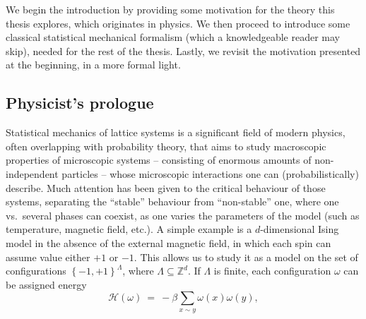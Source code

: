 \documentclass[12pt]{article}
\renewcommand{\H}{\mathcal{H}}
\newcommand{\Z}{\mathbb{Z}}
\newcommand{\set}[1]{\left\{#1\right\}}
\newcommand{\1}{\mathbbm{1}}
\newcommand{\5}{\vspace{0.5cm}}
\theoremstyle{definition}
\begin{document}
We begin the introduction by providing some motivation for the theory this thesis explores, which originates in physics. We then proceed to introduce some classical statistical mechanical formalism (which a knowledgeable reader may skip), needed for the rest of the thesis. Lastly, we revisit the motivation presented at the beginning, in a more formal light.


\subsection{Physicist's prologue}

Statistical mechanics of lattice systems is a significant field of modern physics, often overlapping with probability theory, that aims to study macroscopic properties of microscopic systems -- consisting of enormous amounts of non-independent particles -- whose microscopic interactions one can (probabilistically) describe. Much attention has been given to the critical behaviour of those systems, separating the ``stable'' behaviour from ``non-stable'' one, where one vs.~several phases can coexist, as one varies the parameters of the model (such as temperature, magnetic field, etc.). A simple example is a $d$-dimensional Ising model in the absence of the external magnetic field, in which each spin can assume value either $+1$ or $-1$. This allows us to study it as a model on the set of configurations $\set{-1,+1}^{\Lambda}$, where $\Lambda\subseteq\Z^d$. If $\Lambda$ is finite, each configuration $\omega$ can be assigned energy
$$\H(\omega) ~=~ -\beta\sum_{x\sim y}\omega(x)\omega(y),$$
\end{document}
